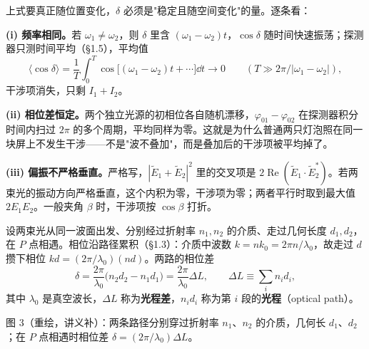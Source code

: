\documentclass[10pt]{ctexart}
\newcommand{\Etil}{\tilde{E}}
\begin{document}

上式要真正随位置变化，$\delta$ 必须是"稳定且随空间变化"的量。逐条看：

\textbf{(i) 频率相同。}若 $\omega_1\ne\omega_2$，则 $\delta$ 里含 $(\omega_1-\omega_2)t$，$\cos\delta$ 随时间快速振荡；探测器只测时间平均（§1.5），平均值
\[
\langle\cos\delta\rangle=\frac{1}{T}\int_0^T\cos\big[(\omega_1-\omega_2)t+\cdots\big]\dd t\to0
\qquad(T\gg 2\pi/|\omega_1-\omega_2|),
\]
干涉项消失，只剩 $I_1+I_2$。

\textbf{(ii) 相位差恒定。}两个独立光源的初相位各自随机漂移，$\varphi_{01}-\varphi_{02}$ 在探测器积分时间内扫过 $2\pi$ 的多个周期，平均同样为零。这就是为什么普通两只灯泡照在同一块屏上不发生干涉——不是"波不叠加"，而是叠加后的干涉项被平均掉了。

\textbf{(iii) 偏振不严格垂直。}严格写，$|\Etil_1+\Etil_2|^2$ 里的交叉项是 $2\operatorname{Re}(\Etil_1\cdot\Etil_2^{*})$。若两束光的振动方向严格垂直，这个内积为零，干涉项为零；两者平行时取到最大值 $2E_1E_2$。一般夹角 $\beta$ 时，干涉项按 $\cos\beta$ 打折。



设两束光从同一波面出发、分别经过折射率 $n_1,n_2$ 的介质、走过几何长度 $d_1,d_2$，在 $P$ 点相遇。相位沿路径累积（§1.3）：介质中波数 $k=nk_0=2\pi n/\lambda_0$，故走过 $d$ 攒下相位 $kd=(2\pi/\lambda_0)(nd)$。两路的相位差
\[
\delta=\frac{2\pi}{\lambda_0}\big(n_2d_2-n_1d_1\big)
=\frac{2\pi}{\lambda_0}\Delta L,
\qquad
\Delta L\equiv\sum_i n_id_i ,
\]
其中 $\lambda_0$ 是真空波长，$\Delta L$ 称为\textbf{光程差}，$n_id_i$ 称为第 $i$ 段的\textbf{光程}（optical path）。


\begin{center}

{\footnotesize\color{inkgray}图 3（重绘，讲义补）：两条路径分别穿过折射率 $n_1$、$n_2$ 的介质，几何长 $d_1$、$d_2$；在 $P$ 点相遇时相位差 $\delta=(2\pi/\lambda_0)\Delta L$。}
\end{center}
\end{document}
